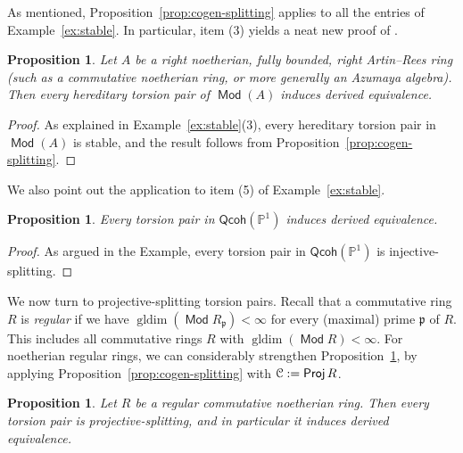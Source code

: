 \documentclass[a4paper,11pt]{amsart}
\theoremstyle{plain}
\newtheorem{prop}[thm]{Proposition}
\theoremstyle{definition}
\newcommand{\Pbb}{\mathbb{P}} \newcommand{\Qbb}{\mathbb{Q}} \newcommand{\Rbb}{\mathbb{R}}
\DeclareMathOperator{\gldim}{gldim}
\DeclareMathOperator{\Proj}{\mathsf{Proj}}
\DeclareMathOperator{\Mod}{\mathsf{Mod}}
\newcommand{\pf}{\mathfrak{p}}
\begin{document}
As mentioned, Proposition~\ref{prop:cogen-splitting} applies to all the entries
of Example~\ref{ex:stable}. In particular, item (3) yields a neat new proof of
\cite[Cor.~5.11]{pavo-vito-21}.

\begin{prop}\label{prop:stable-commutative-noetherian}
	Let $A$ be a right noetherian, fully bounded, right Artin--Rees ring (such as
	a commutative noetherian ring, or more generally an Azumaya algebra). Then
	every hereditary torsion pair of $\Mod(A)$ induces derived equivalence.
\end{prop}

\begin{proof}
	As explained in Example~\ref{ex:stable}(3), every hereditary torsion pair in
	$\Mod(A)$ is stable, and the result follows from
	Proposition~\ref{prop:cogen-splitting}.
\end{proof}

We also point out the application to item (5) of Example~\ref{ex:stable}.

\begin{prop}\label{prop:sheaves}
	Every torsion pair in $\mathsf{Qcoh}(\Pbb^1)$ induces derived equivalence.
\end{prop}

\begin{proof}
	As argued in the Example, every torsion pair in $\mathsf{Qcoh}(\Pbb^1)$ is
	injective-splitting.
\end{proof}

We now turn to projective-splitting torsion pairs.
Recall that a commutative ring $R$ is \emph{regular} if we have $\gldim(\Mod
R_\pf)<\infty$ for every (maximal) prime $\pf$ of $R$. This includes all
commutative rings $R$ with $\gldim(\Mod R)<\infty$.
For noetherian regular rings, we can considerably strengthen
Proposition~\ref{prop:stable-commutative-noetherian}, by applying
Proposition~\ref{prop:cogen-splitting} with $\Ccal:=\Proj R$.

\begin{prop}\label{prop:regular}
	Let $R$ be a regular commutative noetherian ring. Then every torsion pair is
	projective-splitting, and in particular it induces derived equivalence.
\end{prop}
\end{document}
